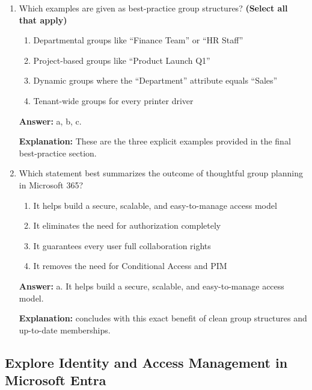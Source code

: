 \documentclass[10pt]{article}
\begin{document}
\begin{enumerate}[leftmargin=*]
\textbf{Explanation:} The best-practice section explicitly recommends aligning group membership with business roles, departments, or projects.

\item Which examples are given as best-practice group structures? \textbf{(Select all that apply)}
\begin{enumerate}[label=\alph*., leftmargin=1.5em]
\item Departmental groups like ``Finance Team'' or ``HR Staff''
\item Project-based groups like ``Product Launch Q1''
\item Dynamic groups where the ``Department'' attribute equals ``Sales''
\item Tenant-wide groups for every printer driver
\end{enumerate}
\textbf{Answer:} a, b, c.

\textbf{Explanation:} These are the three explicit examples provided in the final best-practice section.

\item Which statement best summarizes the outcome of thoughtful group planning in Microsoft 365?
\begin{enumerate}[label=\alph*., leftmargin=1.5em]
\item It helps build a secure, scalable, and easy-to-manage access model
\item It eliminates the need for authorization completely
\item It guarantees every user full collaboration rights
\item It removes the need for Conditional Access and PIM
\end{enumerate}
\textbf{Answer:} a. It helps build a secure, scalable, and easy-to-manage access model.

\textbf{Explanation:} concludes with this exact benefit of clean group structures and up-to-date memberships.

\end{enumerate}
\clearpage

\subsection{Explore Identity and Access Management in Microsoft Entra}
\end{document}
